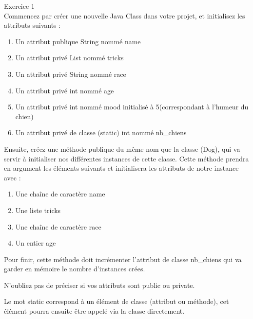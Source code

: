 \begin{Exercice} Exercice 1\\
    Commencez par créer une nouvelle Java Class dans votre projet, et initialisez les attributs suivants :
    \begin{enumerate}
    \item Un attribut publique String nommé name
    \item Un attribut privé List nommé tricks
    \item Un attribut privé String nommé race
    \item Un attribut privé int nommé age
    \item Un attribut privé int nommé mood initialisé à 5(correspondant à l'humeur du chien)
    \item Un attribut privé de classe (static) int nommé nb\_chiens
   	\end{enumerate}
   	
   	Ensuite, créez une méthode publique du même nom que la classe (Dog), qui va servir à initialiser nos différentes instances de cette classe. Cette méthode prendra en argument les éléments suivants et initialisera les attributs de notre instance avec :
   	\begin{enumerate}
    \item Une chaîne de caractère name
    \item Une liste tricks
    \item Une chaîne de caractère race
    \item Un entier age
   	\end{enumerate}
   	
   	Pour finir, cette méthode doit incrémenter l'attribut de classe nb\_chiens qui va garder en mémoire le nombre d'instances crées.
   	
\begin{conseil}
   N'oubliez pas de préciser si vos attributs sont public ou private.
   
   Le mot static correspond à un élément de classe (attribut ou méthode), cet élément pourra ensuite être appelé via la classe directement.
\end{conseil}
    
\begin{solution}
	
\end{solution}
\end{Exercice}

